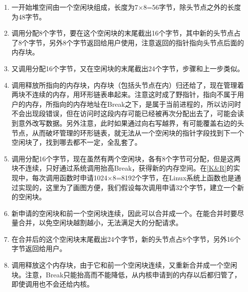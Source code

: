 \begin{enumerate}

\item 一开始堆空间由一个空闲块组成，长度为7×\BookSplit{}8=\BookSplit{}56字节，除头节点之外的长度为48字节。

\item 调用分配8个字节，要在这个空闲块的末尾截出16个字节，其中新的头节点占了8个字节，另外8个字节返回给用户使用，注意返回的指针指向头节点后面的内存块。

\item 又调用分配16个字节，又在空闲块的末尾截出24个字节，步骤和上一步类似。

\item 调用释放所指向的内存块，内存块（包括头节点在内）归还给了，现在管理着两块不连续的内存，用环形链表串起来。注意这时成了野指针，指向不属于用户的内存，所指向的内存地址在Break之下，是属于当前进程的，所以访问时不会出现段错误，但在访问时这段内存可能已经被再次分配出去了，可能会读到意外改写数据。另外注意，此时如果通过向右写越界，有可能覆盖右边的头节点，从而破坏管理的环形链表，就无法从一个空闲块的指针字段找到下一个空闲块了，找到哪去都不一定，全乱套了。

\item 调用分配16个字节，现在虽然有两个空闲块，各有8个字节可分配，但是这两块不连续，只好通过系统调用抬高Break，获得新的内存空间。在\hyperlink{db.bi01.bibli.kr}{[K\&R]}的实现中，每次调用函数时申请1024×\BookSplit{}8=\BookSplit{}8192个字节，在Linux系统上函数也是通过实现的，这里为了画图方便，我们假设每次调用申请32个字节，建立一个新的空闲块。

\item 新申请的空闲块和前一个空闲块连续，因此可以合并成一个。在能合并时要尽量合并，以免空闲块越割越小，无法满足大的分配请求。

\item 在合并后的这个空闲块末尾截出24个字节，新的头节点占8个字节，另外16个字节返回给用户。

\item 调用释放这个内存块，由于它和前一个空闲块连续，又重新合并成一个空闲块。注意，Break只能抬高而不能降低，从内核申请到的内存以后都归管了，即使调用也不会还给内核。
\end{enumerate}

